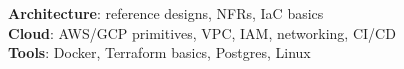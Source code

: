 \begin{itemize}[leftmargin=0.15in, label={}]
  \small{\item{\textbf{Architecture}{: reference designs, NFRs, IaC basics} \\
  \textbf{Cloud}{: AWS/GCP primitives, VPC, IAM, networking, CI/CD} \\
  \textbf{Tools}{: Docker, Terraform basics, Postgres, Linux}}}
\end{itemize}